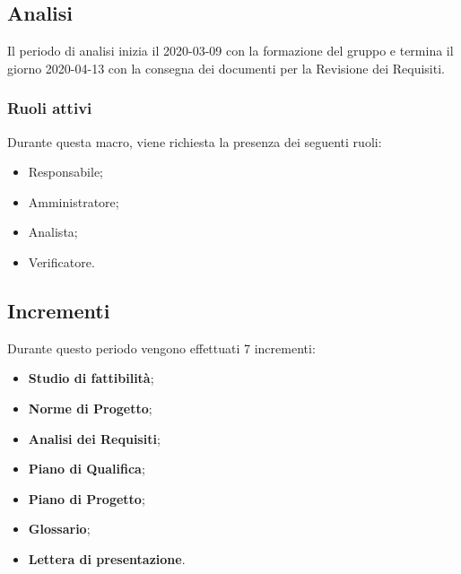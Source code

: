 \documentclass[../piano-di-progetto.tex]{subfiles}
\begin{document}
\subsection{Analisi}
Il periodo di analisi inizia il 2020-03-09 con la formazione del gruppo e termina il giorno 2020-04-13 con la consegna dei documenti per la Revisione dei Requisiti. 

\subsubsection{Ruoli attivi}
Durante questa macro, viene richiesta la presenza dei seguenti ruoli:
\begin{itemize}
    \item Responsabile;
    \item Amministratore;
    \item Analista;
    \item Verificatore.
\end{itemize}

\subsection{Incrementi}
Durante questo periodo vengono effettuati 7 incrementi:

\begin{itemize}
    \item \textbf{Studio di fattibilità};
    \item \textbf{Norme di Progetto};
    \item \textbf{Analisi dei Requisiti};
    \item \textbf{Piano di Qualifica};
    \item \textbf{Piano di Progetto};
    \item \textbf{Glossario};
    \item \textbf{Lettera di presentazione}.
\end{itemize}
\end{document}
